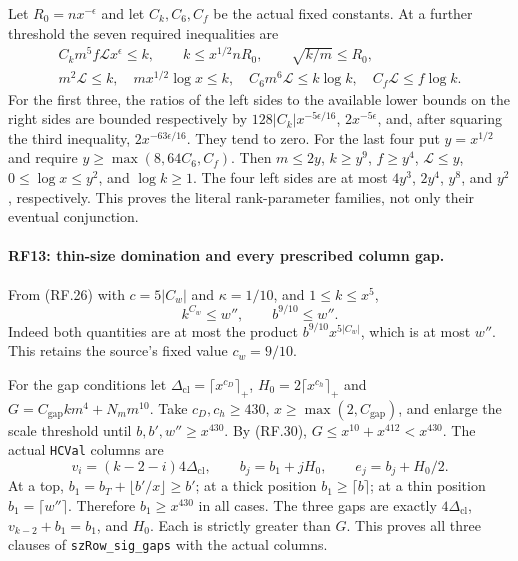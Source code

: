 \documentclass[11pt,a4paper]{article}
\numberwithin{equation}{section}
\theoremstyle{remark}\newtheorem{remark}[theorem]{Remark}
\begin{document}
Let $R_0=nx^{-\epsilon}$ and let $C_k,C_6,C_f$ be the actual fixed
constants. At a further threshold the seven required inequalities are
\[
\begin{gathered}
 C_km^5f\mathcal L x^\epsilon\leq k,\qquad
 k\leq x^{1/2}nR_0,\qquad \sqrt{k/m}\leq R_0,\\
 m^2\mathcal L\leq k,\quad mx^{1/2}\log x\leq k,\quad
 C_6m^6\mathcal L\leq k\log k,\quad C_f\mathcal L\leq f\log k.
\end{gathered}                                                 \tag{RF.31}
\]
For the first three, the ratios of the left sides to the available
lower bounds on the right sides are bounded respectively by
$128|C_k|x^{-5\epsilon/16}$,
$2x^{-5\epsilon}$, and, after squaring the third inequality,
$2x^{-63\epsilon/16}$. They tend to zero.
For the last four put $y=x^{1/2}$ and require
$y\geq\max(8,64C_6,C_f)$. Then
$m\leq2y$, $k\geq y^9$, $f\geq y^4$,
$\mathcal L\leq y$, $0\leq\log x\leq y^2$, and $\log k\geq1$.
The four left sides are at most $4y^3$, $2y^4$, $y^8$, and $y^2$,
respectively. This proves the literal rank-parameter families, not only
their eventual conjunction.

\paragraph{RF13: thin-size domination and every prescribed column gap.}
From (RF.26) with $c=5|C_w|$ and $\kappa=1/10$, and $1\leq k\leq x^5$,
\[
                    k^{C_w}\leq w'',\qquad b^{9/10}\leq w''.
                                                               \tag{RF.32}
\]
Indeed both quantities are at most the product
$b^{9/10}x^{5|C_w|}$, which is at most $w''$.
This retains the source's fixed value $c_w=9/10$.

For the gap conditions let
$\Delta_{\mathrm{cl}}=\lceil x^{c_D}\rceil_+$,
$H_0=2\lceil x^{c_h}\rceil_+$ and
$G=C_{\mathrm{gap}}km^4+N_m m^{10}$.
Take $c_D,c_h\geq430$, $x\geq\max(2,C_{\mathrm{gap}})$,
and enlarge the scale threshold until $b,b',w''\geq x^{430}$.
By (RF.30),
$G\leq x^{10}+x^{412}<x^{430}$.
The actual \texttt{HCVal} columns are
\[
 v_i=(k-2-i)4\Delta_{\mathrm{cl}},\qquad b_j=b_1+jH_0,
       \qquad e_j=b_j+H_0/2.                                 \tag{RF.33}
\]
At a top, $b_1=b_T+\lfloor b'/x\rfloor\geq b'$; at a thick
position $b_1\geq\lceil b\rceil$; at a thin position
$b_1=\lceil w''\rceil$. Therefore $b_1\geq x^{430}$ in all cases.
The three gaps are exactly $4\Delta_{\mathrm{cl}}$, $v_{k-2}+b_1=b_1$, and $H_0$.
Each is strictly greater than $G$. This proves all three clauses of
\texttt{szRow\_\allowbreak sig\_\allowbreak gaps} with the actual columns.
\end{document}
